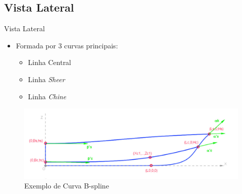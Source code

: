 \documentclass{beamer}
\begin{document}
\subsection{Vista Lateral}
\begin{frame}{Vista Lateral}
\begin{itemize}
	\item Formada por 3 curvas principais:
		\begin{itemize}
			\item Linha Central
			\item Linha \textit{Sheer}
			\item Linha \textit{Chine}
		\end{itemize}
\end{itemize}
\begin{figure}[h]
	\centering
	\includegraphics[scale=0.4]{vistalateral}
	\caption{Exemplo de Curva B-spline}
	\label{fig:central}
\end{figure}
\end{frame}
\end{document}
